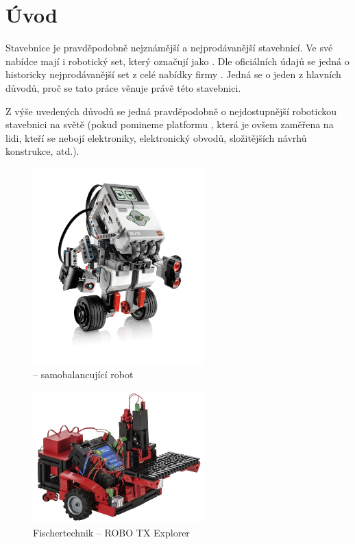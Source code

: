 \chapter{Úvod}

Stavebnice \lego{ }je pravděpodobně nejznámější a nejprodávanější stavebnicí. 
Ve své nabídce mají i robotický set, který označují jako \legoM. 
Dle oficiálních údajů se jedná o historicky nejprodávanější set z celé nabídky firmy \cite{legoMindstorms_GizmodoSalesStatistic}. 
Jedná se o jeden z hlavních důvodů, proč se tato práce věnuje právě této stavebnici. 

Z výše uvedených důvodů se jedná pravděpodobně o nejdostupnější robotickou stavebnici na světě (pokud pomineme platformu \arduino, která je ovšem zaměřena na lidi, kteří se nebojí elektroniky, elektronický obvodů, složitějších návrhů konstrukce, atd.).

\begin{figure}[h]
 	\centering
	\includegraphics[width=250px]{images/lego-mindstorms-ev3_Robotics-for-Kids.png}
		\caption[\legoEV{ }-- samobalancující robot]{\legoEV{ }-- samobalancující robot\protect\footnotemark}
	\label{fig:lego-mindstorms-ev3_Robotics-for-Kids}
\end{figure}



\begin{figure}[h]
 	\centering
	\includegraphics[width=250px]{images/fischertechnik_ROBO-TX-Explorer_02.jpg}
		\caption[Fischertechnik -- ROBO TX Explorer]{Fischertechnik -- ROBO TX Explorer\protect\footnotemark}
	\label{fig:fischertechnik_ROBO-TX-Explorer}
\end{figure}

